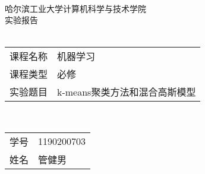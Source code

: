 \begin{center}
    \quad \vspace{3cm} \\
    \Large
    哈尔滨工业大学计算机科学与技术学院 \\
    
    \Huge
    实验报告 \\
    \quad \vspace{1cm} \\
    
    \Large
    \begin{tabular}{r@{：}l}
        课程名称 & 机器学习 \\
        课程类型 & 必修 \\
        实验题目 & k-means聚类方法和混合高斯模型 \\
    \end{tabular}
    \quad \vspace{1cm} \\
    
    \large
    \begin{tabular}{r@{：}l}
    学号 & 1190200703 \\
    姓名 & 管健男 \\
    \end{tabular}

\end{center}
